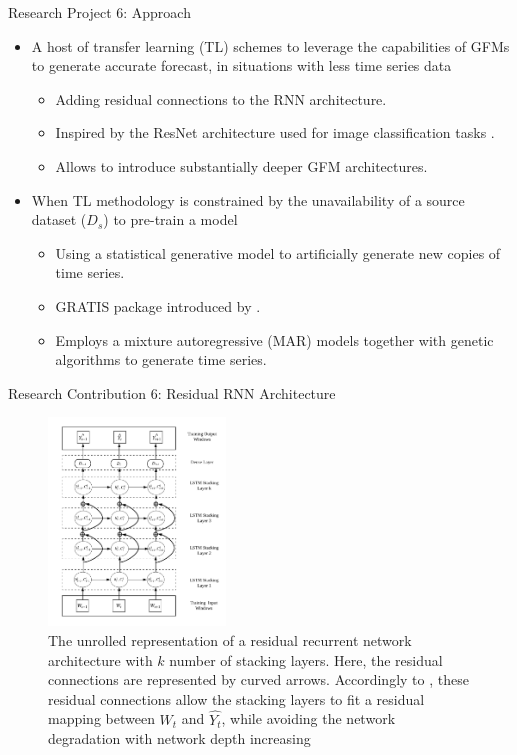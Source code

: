 \documentclass{beamer}
\begin{document}
\begin{frame}{Research Project 6: Approach}
   \begin{itemize}
	\item A host of transfer learning (TL) schemes to leverage the capabilities of GFMs to generate accurate forecast, in situations with less time series data
	\vspace{1mm}
		\begin{itemize}
		\item \color{blue} Adding residual connections to the RNN architecture.
		\item \color{blue} Inspired by the ResNet architecture used for image classification tasks \cite{He2016-wm}.
		\item \color{blue} Allows to introduce substantially deeper GFM architectures.
 		\end{itemize}
 		\vspace{2mm}
 	\item When TL methodology is constrained by the unavailability of a source dataset ($D_s$) to pre-train a model
 	\begin{itemize}
		\item \color{blue} Using a statistical generative model to artificially generate new copies of time series.
		\item \color{blue} GRATIS package introduced by \cite{Kang2019-dy}.
		\item \color{blue} Employs a mixture autoregressive (MAR) models together with genetic algorithms to generate time series.
 		\end{itemize}
\end{itemize}
\end{frame}

\begin{frame}{Research Contribution 6: Residual RNN Architecture}
   \begin{figure}[htbp]
\centerline{\includegraphics[width=0.42\textwidth]{images/resnetarch}}
\caption{ \tiny The unrolled representation of a residual recurrent network architecture with $k$ number of stacking layers. Here, the residual connections are represented by curved arrows. Accordingly to \cite{He2016-wm}, these residual connections allow the stacking layers to fit a residual mapping between $W_t$ and $\hat{Y_{t}}$, while avoiding the network degradation with network depth increasing}
\label{forecastingarch}
\end{figure}
\end{frame}
\end{document}
